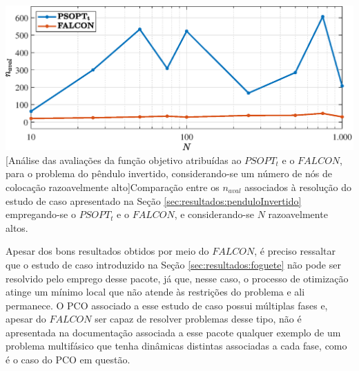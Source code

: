 \noindent	
\begin{minipage}{\textwidth}
	\vspace{\onelineskip}
	\centering
	\includegraphics[width=1\linewidth]{fig/resultados/obs/bigN/Nxn}
	[Análise das avaliações da função objetivo atribuídas ao $ PSOPT_t $ e o $ FALCON $, para o problema do pêndulo invertido, considerando-se um número de nós de colocação razoavelmente alto]{Comparação entre os $ n_{aval} $ associados à resolução do estudo de caso apresentado na Seção \ref{sec:resultados:penduloInvertido} empregando-se o $ PSOPT_t $ e o $ FALCON $, e considerando-se $ N $ razoavelmente altos.}
	\label{fig:resultados:conclusao:Nxn}
	\vspace{\onelineskip}
\end{minipage}


Apesar dos bons resultados obtidos por meio do $ FALCON $, é preciso ressaltar que o estudo de caso introduzido na Seção \ref{sec:resultados:foguete} não pode ser resolvido pelo emprego desse pacote, já que, nesse caso, o processo de otimização atinge um mínimo local que não atende às restrições do problema e ali permanece. O PCO associado a esse estudo de caso possui múltiplas fases e, apesar do $ FALCON $ ser capaz de resolver problemas desse tipo, não é apresentada na documentação associada a esse pacote qualquer exemplo de um problema multifásico que tenha dinâmicas distintas associadas a cada fase, como é o caso do PCO em questão. 


